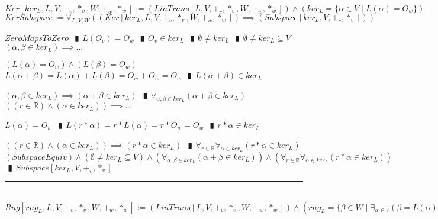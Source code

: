 \documentclass{book}
\newcommand{\abr}{:=}
\newcommand{\pipe}{$\phantom{(}\vrectangleblack\phantom{)}$}
\newcommand{\st}{\mathbin{|}}
\begin{document}
$Ker[ker_L, L, V, +_v, *_v, W, +_w, *_w] \abr (LinTrans[L, V, +_v, *_v, W, +_w, *_w]) \land (ker_L = \{\alpha \in V \st L(\alpha) = O_w\})$ \\

$KerSubspace \abr \forall_{L, V, W}((Ker[ker_L, L, V, +_v, *_v, W, +_w, *_w]) \implies (Subspace[ker_L, V, +_v, *_v]))$
\begin{enumerate}
  \lit $ZeroMapsToZero$ \pipe $L(O_v) = O_w$ \pipe $O_v \in ker_L$ \pipe $\emptyset \neq ker_L$ \pipe $\emptyset \neq ker_L \subseteq V$
  \lit $(\alpha, \beta \in ker_L) \implies \ldots$
  \begin{enumerate}
    \lit $(L(\alpha) = O_w) \land (L(\beta) = O_w)$ \lit $L(\alpha + \beta) = L(\alpha) + L(\beta) = O_w + O_w = O_w$ \pipe $L(\alpha + \beta) \in ker_L$
  \end{enumerate}
  \lit $(\alpha, \beta \in ker_L) \implies (\alpha + \beta \in ker_L)$ \pipe $\forall_{\alpha, \beta \in ker_L}(\alpha + \beta \in ker_L)$
  \lit $((r \in \mathbb{R}) \land (\alpha \in ker_L)) \implies \ldots$
  \begin{enumerate}
    \lit $L(\alpha) = O_w$ \pipe $L(r * \alpha) = r * L(\alpha) = r * O_w = O_w$ \pipe $r * \alpha \in ker_L$
  \end{enumerate}
  \lit $((r \in \mathbb{R}) \land (\alpha \in ker_L)) \implies (r * \alpha \in ker_L)$ \pipe $\forall_{r \in \mathbb{R}} \forall_{\alpha \in ker_L}(r * \alpha \in ker_L)$
  \lit $(SubspaceEquiv) \land (\emptyset \neq ker_L \subseteq V) \land (\forall_{\alpha, \beta \in ker_L}(\alpha + \beta \in ker_L)) \land (\forall_{r \in \mathbb{R}} \forall_{\alpha \in ker_L}(r * \alpha \in ker_L))$ \pipe $Subspace[ker_L, V, +_v, *_v]$
\end{enumerate} \vspace{.75mm} \hrule \vspace{.75mm} \ \\ 

$Rng[rng_L, L, V, +_v, *_v, W, +_w, *_w] \abr (LinTrans[L, V, +_v, *_v, W, +_w, *_w]) \land (rng_L = \{\beta \in W \st \exists_{\alpha \in V}(\beta = L(\alpha))\})$ \\
\end{document}

